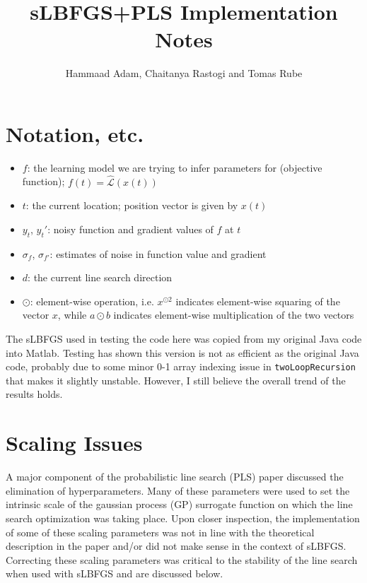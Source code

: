 \documentclass{article}
\begin{document}
\title{sLBFGS+PLS Implementation Notes}
\author{Hammaad Adam, Chaitanya Rastogi and Tomas Rube}
\maketitle

\section{Notation, etc.}
\begin{itemize}
	\item $f$: the learning model we are trying to infer parameters for (objective function); $f(t) = \hat{\mathcal{L}}(x(t))$ 
	\item $t$: the current location; position vector is given by $x(t)$
	\item $y_t$, $y_t'$: noisy function and gradient values of $f$ at $t$
	\item $\sigma_f$, $\sigma_{f'}$: estimates of noise in function value and gradient
	\item $d$: the current line search direction
	\item $\odot$: element-wise operation, i.e. $x^{\odot 2}$ indicates element-wise squaring of the vector $x$, while $a\odot b$ indicates element-wise multiplication of the two vectors
\end{itemize}
The sLBFGS used in testing the code here was copied from my original Java code into Matlab. Testing has shown this version is not as efficient as the original Java code, probably due to some minor 0-1 array indexing issue in \texttt{twoLoopRecursion} that makes it slightly unstable. However, I still believe the overall trend of the results holds. 
\section{Scaling Issues}
A major component of the probabilistic line search (PLS) paper discussed the elimination of hyperparameters. Many of these parameters were used to set the intrinsic scale of the gaussian process (GP) surrogate function on which the line search optimization was taking place. Upon closer inspection, the implementation of some of these scaling parameters was not in line with the theoretical description in the paper and/or did not make sense in the context of sLBFGS. Correcting these scaling parameters was critical to the stability of the line search when used with sLBFGS and are discussed below.
\end{document}
